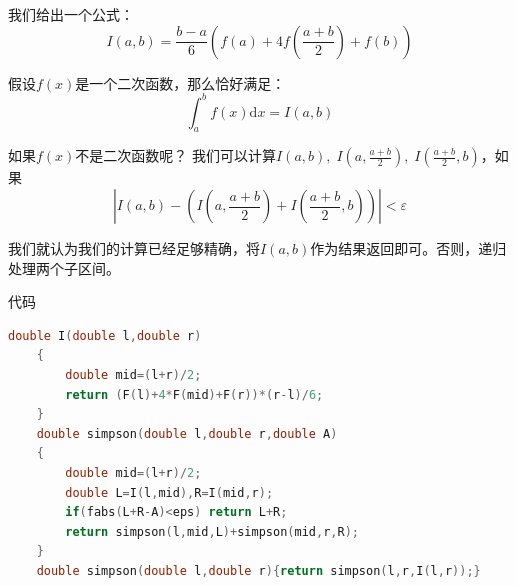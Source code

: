 \documentclass{beamer}
\begin{document}
\begin{frame}
    我们给出一个公式：
    \begin{equation*}
        I(a,b)=\frac{b-a}{6}\left(f(a)+4f\left(\frac{a+b}{2}\right)+f(b)\right)
    \end{equation*}
    
    假设$f(x)$是一个二次函数，那么恰好满足：
    \begin{equation*}
        \int_a^b f(x)\text{d}x=I(a,b)
    \end{equation*}

    如果$f(x)$不是二次函数呢？\pause
    我们可以计算$I(a,b),\;I\left(a,\frac{a+b}{2}\right),\;I\left(\frac{a+b}{2},b\right)$，如果
    \begin{equation*}
        \left|I(a,b)-\left(I\left(a,\frac{a+b}{2}\right)+I\left(\frac{a+b}{2},b\right)\right)\right| < \varepsilon
    \end{equation*}

    我们就认为我们的计算已经足够精确，将$I(a,b)$作为结果返回即可。否则，递归处理两个子区间。
\end{frame}

\begin{frame}[fragile]{代码}
    \begin{minipage}{\linewidth}
    \begin{lstlisting}[language=c++]
    double I(double l,double r)
    {
        double mid=(l+r)/2;
        return (F(l)+4*F(mid)+F(r))*(r-l)/6;
    }
    double simpson(double l,double r,double A)
    {
        double mid=(l+r)/2;
        double L=I(l,mid),R=I(mid,r);
        if(fabs(L+R-A)<eps) return L+R;
        return simpson(l,mid,L)+simpson(mid,r,R);
    }
    double simpson(double l,double r){return simpson(l,r,I(l,r));}
    \end{lstlisting}
    \end{minipage}
\end{frame}
\end{document}
